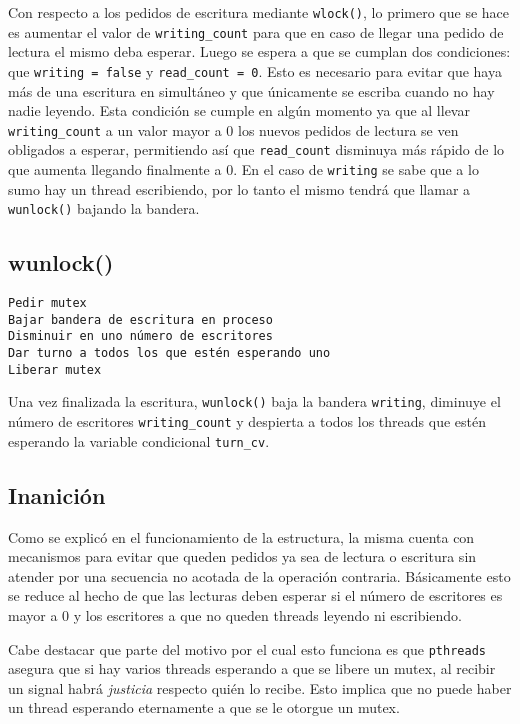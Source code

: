 \documentclass[a4paper]{article}
\begin{document}
Con respecto a los pedidos de escritura mediante \texttt{wlock()}, lo primero
que se hace es aumentar el valor de \texttt{writing\_count} para que en caso de
llegar una pedido de lectura el mismo deba esperar. Luego se espera a que se
cumplan dos condiciones: que \texttt{writing = false} y \texttt{read\_count =
0}. Esto es necesario para evitar que haya más de una escritura en simultáneo y
que únicamente se escriba cuando no hay nadie leyendo. Esta condición se cumple
en algún momento ya que al llevar \texttt{writing\_count} a un valor mayor a 0 los
nuevos pedidos de lectura se ven obligados a esperar, permitiendo así que
\texttt{read\_count} disminuya más rápido de lo que aumenta llegando finalmente
a 0. En el caso de \texttt{writing} se sabe que a lo sumo hay un thread
escribiendo, por lo tanto el mismo tendrá que llamar a \texttt{wunlock()}
bajando la bandera.

\subsection*{wunlock()}
\begin{codesnippet}
\begin{verbatim}
Pedir mutex
Bajar bandera de escritura en proceso
Disminuir en uno número de escritores
Dar turno a todos los que estén esperando uno
Liberar mutex
\end{verbatim}
\end{codesnippet}
Una vez finalizada la escritura, \texttt{wunlock()} baja la bandera
\texttt{writing}, diminuye el número de escritores \texttt{writing\_count} y
despierta a todos los threads que estén esperando la variable condicional
\texttt{turn\_cv}.

\subsection{Inanición}

Como se explicó en el funcionamiento de la estructura, la misma cuenta con
mecanismos para evitar que queden pedidos ya sea de lectura o escritura sin
atender por una secuencia no acotada de la operación contraria. Básicamente esto
se reduce al hecho de que las lecturas deben esperar si el número de escritores
es mayor a 0 y los escritores a que no queden threads leyendo ni escribiendo.

Cabe destacar que parte del motivo por el cual esto funciona es que
\texttt{pthreads} asegura que si hay varios threads esperando a que se libere un
mutex, al recibir un signal habrá \emph{justicia} respecto quién lo recibe. Esto implica
que no puede haber un thread esperando eternamente a que se le otorgue un mutex.
\end{document}
